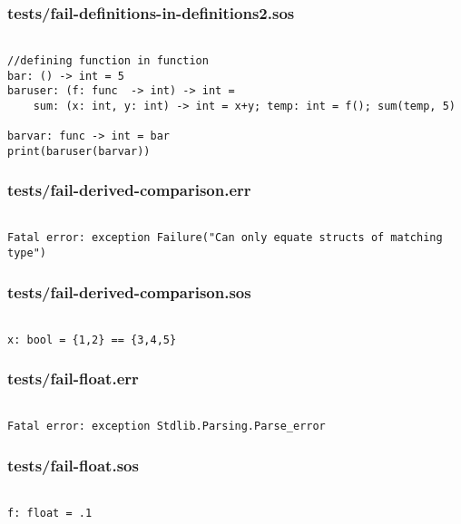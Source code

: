 \documentclass[main.tex]{subfiles}
\begin{document}
\subsubsection{tests/fail-definitions-in-definitions2.sos}

\begin{lstlisting}

//defining function in function
bar: () -> int = 5
baruser: (f: func  -> int) -> int = 
    sum: (x: int, y: int) -> int = x+y; temp: int = f(); sum(temp, 5)

barvar: func -> int = bar
print(baruser(barvar))
\end{lstlisting}

\subsubsection{tests/fail-derived-comparison.err}

\begin{lstlisting}

Fatal error: exception Failure("Can only equate structs of matching type")
\end{lstlisting}

\subsubsection{tests/fail-derived-comparison.sos}

\begin{lstlisting}

x: bool = {1,2} == {3,4,5}
\end{lstlisting}

\subsubsection{tests/fail-float.err}

\begin{lstlisting}

Fatal error: exception Stdlib.Parsing.Parse_error
\end{lstlisting}

\subsubsection{tests/fail-float.sos}

\begin{lstlisting}

f: float = .1
\end{lstlisting}
\end{document}
